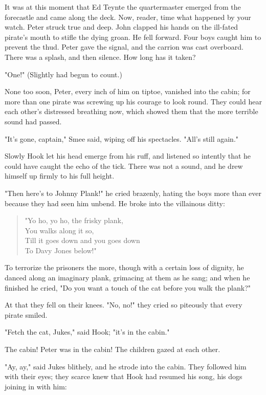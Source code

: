 It was at this moment that Ed Teynte the quartermaster emerged from the forecastle and came along the deck.
Now, reader, time what happened by your watch.
Peter struck true and deep.
John clapped his hands on the ill-fated pirate's mouth to stifle the dying groan.
He fell forward.
Four boys caught him to prevent the thud.
Peter gave the signal, and the carrion was cast overboard.
There was a splash, and then silence.
How long has it taken?

"One!"
(Slightly had begun to count.)

None too soon, Peter, every inch of him on tiptoe, vanished into the cabin;
for more than one pirate was screwing up his courage to look round.
They could hear each other's distressed breathing now,
which showed them that the more terrible sound had passed.

"It's gone, captain," Smee said, wiping off his spectacles.
"All's still again."

Slowly Hook let his head emerge from his ruff,
and listened so intently that he could have caught the echo of the tick.
There was not a sound, and he drew himself up firmly to his full height.

"Then here's to Johnny Plank!\@" he cried brazenly,
hating the boys more than ever because they had seen him unbend.
He broke into the villainous ditty:

\begin{verse}
	"Yo ho, yo ho, the frisky plank,\\
	You walks along it so,\\
	Till it goes down and you goes down\\
	To Davy Jones below!"
\end{verse}

To terrorize the prisoners the more, though with a certain loss of dignity,
he danced along an imaginary plank, grimacing at them as he sang;
and when he finished he cried, "Do you want a touch of the cat before you walk the plank?"

At that they fell on their knees.
"No, no!\@" they cried so piteously that every pirate smiled.

"Fetch the cat, Jukes," said Hook;
"it's in the cabin."

The cabin!
Peter was in the cabin!
The children gazed at each other.

"Ay, ay," said Jukes blithely, and he strode into the cabin.
They followed him with their eyes;
they scarce knew that Hook had resumed his song, his dogs joining in with him:

